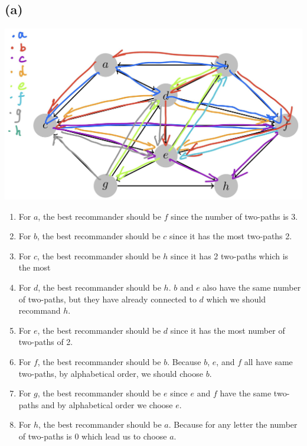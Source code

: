 \documentclass{article}
\begin{document}
\subsection*{(a)}
\includegraphics[scale = 0.25]{graph.jpg}

\begin{enumerate}
    \item For $a$, the best recommander should be $f$ since the number of two-paths is 3.
    \item For $b$, the best recommander should be $c$ since it has the most two-paths 2.
    \item For $c$, the best recommander should be $h$ since it has 2 two-paths which is the most
    \item For $d$, the best recommander should be $h$. $b$ and $e$ also have the same number of two-paths, but they have already connected to $d$ which we should recommand $h$.
    \item For $e$, the best recommander should be $d$ since it has the most number of two-paths of 2.
    \item For $f$, the best recommander should be $b$. Because $b$, $e$, and $f$ all have same two-paths, by alphabetical order, we should choose $b$.
    \item For $g$, the best recommander should be $e$ since $e$ and $f$ have the same two-paths and by alphabetical order we choose $e$.
    \item For $h$, the best recommander should be $a$. Because for any letter the number of two-paths is 0 which lead us to choose $a$.
\end{enumerate}
\end{document}
